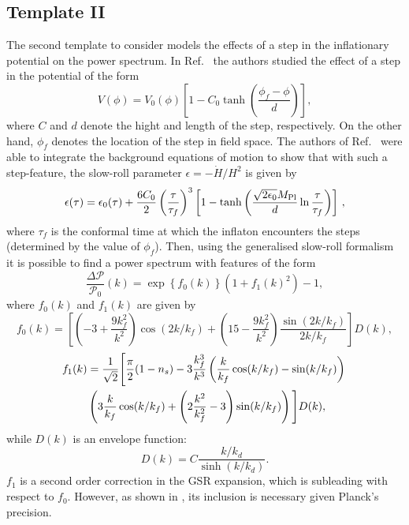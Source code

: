\documentclass[12pt]{article}
\newcommand{\nn}{{\nonumber}}
\newcommand{\be}{\begin{equation}}
\newcommand{\ee}{\end{equation}}
\newcommand{\bea}{\begin{eqnarray}}
\newcommand{\eea}{\end{eqnarray}}
\begin{document}
\subsection{Template II}

The second template to consider models the effects of a step in the inflationary potential on the power spectrum. In Ref.~\cite{Adshead:2011jq} the authors studied the effect of a step in the potential of the form
\be \label{Vstep}
V(\phi) = V_0(\phi) \left[ 1 - C_0 \tanh \left(\frac{\phi_f - \phi}{d} \right) \right] ,
\ee
where $C$ and $d$ denote the hight and length of the step, respectively. On the other hand, $\phi_f$ denotes the location of the step in field space. The authors of Ref.~\cite{Adshead:2011jq} were able to integrate the background equations of motion to show that with such a step-feature, the slow-roll parameter $\epsilon = - \dot H / H^2$ is given by
\be
\epsilon (\tau) = \epsilon_0 (\tau)  +  \frac{ 6 C_0}{2}  \left( \frac{\tau}{\tau_f} \right)^3  \left[ 1 - \tanh \left( \frac{\sqrt{2\epsilon_0}M_{\rm Pl}}{d} \ln \frac{\tau}{\tau_f}\right) \right]\,, \label{epsilon-tau-1}
\ee
where $\tau_f$ is the conformal time at which the inflaton encounters the steps (determined by the value of $\phi_f$). Then, using the generalised slow-roll formalism it is possible to find a power spectrum with features of the form \cite{Miranda:2013wxa}
%
\be
\frac{\Delta \mathcal P}{\mathcal P_0 } (k) = \exp \left\{ f_0(k) \right\}(1+f_1(k)^2) -1, \label{step}
\ee
where $f_0(k)$ and $f_1(k)$ are given by
\be
f_0(k)  = \left[ \left( -3+\frac{9 k_f^2}{k^2 } \right)\cos(2 k /k_f) + \left(15 - \frac{9 k_f^2}{k^2} \right)\frac{\sin(2k / k_f)}{2k /k_f}  \right]  D(k) ,
\ee
%
\bea
f_1(k)  &= \dfrac{1}{\sqrt{2}} \Bigg[ \dfrac{\pi}{2}(1-n_s) -3\dfrac{k_f^3}{k^3}\left( \dfrac{ k}{k_f } \cos( k /k_f) - \sin( k /k_f)  \right)  \nn\\& \left(3 \dfrac{ k}{k_f } \cos( k /k_f) +\left( 2\dfrac{ k^2}{k_f^2 }-3 \right) \sin( k /k_f) \right)  \Bigg]  D(k) ,
\eea
while $D(k)$ is an envelope function:
%
\be
D(k) = C \frac{k /k_d}{\sinh(k /k_d)} .
\ee 
%
$f_1$ is a second order correction in the GSR expansion, which is subleading with respect to $f_0$. However, as shown in \cite{Miranda:2013wxa}, its inclusion is necessary given Planck's precision.
\end{document}
